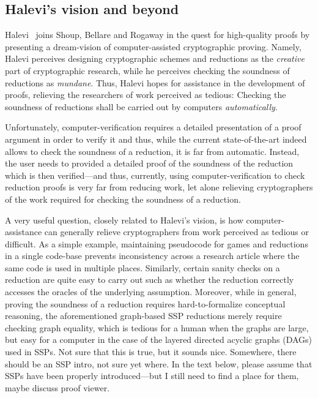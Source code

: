 \subsection{Halevi's vision and beyond}
Halevi~\cite{X} joins Shoup, Bellare and Rogaway in the quest for
high-quality proofs by presenting a dream-vision of computer-assisted 
cryptographic proving. Namely, Halevi perceives designing cryptographic 
schemes and reductions as the \emph{creative} part of cryptographic research, 
while he perceives checking the soundness of reductions as \emph{mundane}. 
Thus, Halevi hopes for assistance in the development of proofs, relieving 
the researchers of work perceived as tedious: Checking the soundness 
of reductions shall be carried out by computers \emph{automatically}.

Unfortunately, computer-verification requires a detailed presentation of a 
proof argument in order to verify it and thus, while the current state-of-the-art
indeed allows to check the soundness of a reduction, it is far from automatic.
Instead, the user needs to provided a detailed proof of the soundness of the
reduction which is then verified---and thus, currently, using computer-verification
to check reduction proofs is very far from reducing work, let alone relieving
cryptographers of the work required for checking the soundness of a reduction.

A very useful question, closely related to Halevi's vision, is how
computer-assistance can generally relieve cryptographers from work perceived 
as tedious or difficult. %
As a simple example, maintaining pseudocode for games and reductions in a single 
code-base prevents inconsistency across a research article where the same code
is used in multiple places. Similarly, certain sanity checks on a reduction
are quite easy to carry out such as whether the reduction correctly accesses the
oracles of the underlying assumption. Moreover, while in general, proving the soundness of a reduction requires hard-to-formalize conceptual reasoning, the aforementioned graph-based SSP reductions merely require checking graph equality,
which is tedious for a human when the graphs are large, but easy for a computer in the case of the layered directed acyclic graphs (DAGs) used in SSPs. {\color{blue} Not sure that this is true, but it sounds nice. Somewhere, there should be an SSP intro, not sure yet where. In the text below, please assume that SSPs have been properly introduced---but I still need to find a place for them, maybe discuss proof viewer.}

